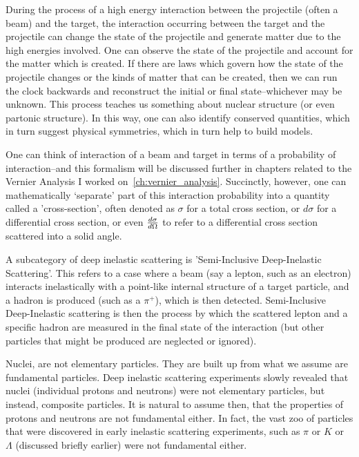 During the process of a high energy interaction between the projectile (often a
beam) and the target, the interaction occurring between the target and the
projectile can change the state of the projectile and generate matter due to the
high energies involved. One can observe the state of the projectile and account
for the matter which is created. If there are laws which govern how the state of
the projectile changes or the kinds of matter that can be created, then we can
run the clock backwards and reconstruct the initial or final state--whichever
may be unknown. This process teaches us something about nuclear structure (or
even partonic structure). In this way, one can also identify conserved
quantities, which in turn suggest physical symmetries, which in turn help to
build models.

One can think of interaction of a beam and target in terms of a probability of
interaction--and this formalism will be discussed further in chapters related to
the Vernier Analysis I worked on~\ref{ch:vernier_analysis}. Succinctly, however,
one can mathematically `separate' part of this interaction probability into a
quantity called a 'cross-section', often denoted as $\sigma$ for a total cross
section, or $d\sigma$ for a differential cross section, or even
${d\sigma}\over{d\Omega}$ to refer to a differential cross section scattered
into a solid angle. 

A subcategory of deep inelastic scattering is 'Semi-Inclusive Deep-Inelastic
Scattering'. This refers to a case where a beam (say a lepton, such as an
electron) interacts inelastically with a point-like internal structure of a
target particle, and a hadron is produced (such as a $\pi^+$), which is then
detected. Semi-Inclusive Deep-Inelastic scattering is then the process by which
the scattered lepton and a specific hadron are measured in the final state of
the interaction (but other particles that might be produced are neglected or
ignored).

Nuclei, are not elementary particles. They are built up from what we assume are
fundamental particles. Deep inelastic scattering experiments slowly revealed
that nuclei (individual protons and neutrons) were not elementary particles, but
instead, composite particles.  It is natural to assume then, that the properties
of protons and neutrons are not fundamental either.  In fact, the vast zoo of
particles that were discovered in early inelastic scattering experiments, such
as $\pi$ or $K$ or $\Lambda$ (discussed briefly earlier) were not fundamental
either.


